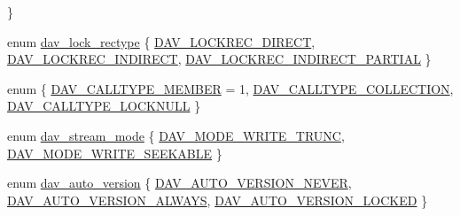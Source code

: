 \begin{DoxyCompactItemize}
 \}
\item 
enum \hyperlink{group__MOD__DAV_ga35626623c09f0611245743b5868eb936}{dav\+\_\+lock\+\_\+rectype} \{ \hyperlink{group__MOD__DAV_gga35626623c09f0611245743b5868eb936a14a2b13c257d1578c1700d6aca8efdc7}{D\+A\+V\+\_\+\+L\+O\+C\+K\+R\+E\+C\+\_\+\+D\+I\+R\+E\+CT}, 
\hyperlink{group__MOD__DAV_gga35626623c09f0611245743b5868eb936ac4db8060ad15f6447c36ead91911c712}{D\+A\+V\+\_\+\+L\+O\+C\+K\+R\+E\+C\+\_\+\+I\+N\+D\+I\+R\+E\+CT}, 
\hyperlink{group__MOD__DAV_gga35626623c09f0611245743b5868eb936a54f61e288144fbd760131e3c98356d41}{D\+A\+V\+\_\+\+L\+O\+C\+K\+R\+E\+C\+\_\+\+I\+N\+D\+I\+R\+E\+C\+T\+\_\+\+P\+A\+R\+T\+I\+AL}
 \}
\item 
enum \{ \hyperlink{group__MOD__DAV_gga0411cd49bb5b71852cecd93bcbf0ca2dab6659c0bbe2c3389db76fecc4e9e67a7}{D\+A\+V\+\_\+\+C\+A\+L\+L\+T\+Y\+P\+E\+\_\+\+M\+E\+M\+B\+ER} = 1, 
\hyperlink{group__MOD__DAV_gga0411cd49bb5b71852cecd93bcbf0ca2daa53efecda100903972b168129d161e0b}{D\+A\+V\+\_\+\+C\+A\+L\+L\+T\+Y\+P\+E\+\_\+\+C\+O\+L\+L\+E\+C\+T\+I\+ON}, 
\hyperlink{group__MOD__DAV_gga0411cd49bb5b71852cecd93bcbf0ca2da6917f69713923c0aec6c925af9ad4f39}{D\+A\+V\+\_\+\+C\+A\+L\+L\+T\+Y\+P\+E\+\_\+\+L\+O\+C\+K\+N\+U\+LL}
 \}
\item 
enum \hyperlink{group__MOD__DAV_gaa9b8fd424c6f34394f12b0278bdc747b}{dav\+\_\+stream\+\_\+mode} \{ \hyperlink{group__MOD__DAV_ggaa9b8fd424c6f34394f12b0278bdc747baed0c12b04277f546544b106a44f5aea2}{D\+A\+V\+\_\+\+M\+O\+D\+E\+\_\+\+W\+R\+I\+T\+E\+\_\+\+T\+R\+U\+NC}, 
\hyperlink{group__MOD__DAV_ggaa9b8fd424c6f34394f12b0278bdc747ba16a781775dce0c24f5981c51716d0008}{D\+A\+V\+\_\+\+M\+O\+D\+E\+\_\+\+W\+R\+I\+T\+E\+\_\+\+S\+E\+E\+K\+A\+B\+LE}
 \}
\item 
enum \hyperlink{group__MOD__DAV_ga3e7f63f564d3cdf36d400e92e309397d}{dav\+\_\+auto\+\_\+version} \{ \hyperlink{group__MOD__DAV_gga3e7f63f564d3cdf36d400e92e309397da05645f3619952cd10b261b4a8d811cea}{D\+A\+V\+\_\+\+A\+U\+T\+O\+\_\+\+V\+E\+R\+S\+I\+O\+N\+\_\+\+N\+E\+V\+ER}, 
\hyperlink{group__MOD__DAV_gga3e7f63f564d3cdf36d400e92e309397dad2eb1c7c8301e90683dfffbcaacde272}{D\+A\+V\+\_\+\+A\+U\+T\+O\+\_\+\+V\+E\+R\+S\+I\+O\+N\+\_\+\+A\+L\+W\+A\+YS}, 
\hyperlink{group__MOD__DAV_gga3e7f63f564d3cdf36d400e92e309397da26c8864746f09dd0f3be5aedbd80412d}{D\+A\+V\+\_\+\+A\+U\+T\+O\+\_\+\+V\+E\+R\+S\+I\+O\+N\+\_\+\+L\+O\+C\+K\+ED}
 \}
\end{DoxyCompactItemize}
